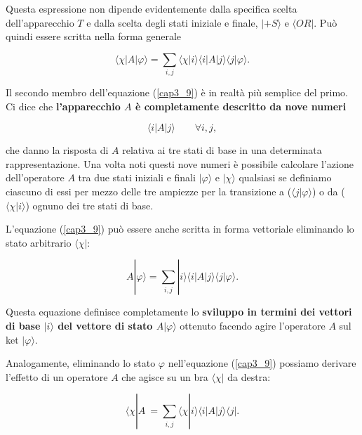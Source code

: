 Questa espressione non dipende evidentemente dalla specifica scelta dell'apparecchio $T$ e dalla scelta degli stati iniziale e finale, $| +S \rangle $ e $\langle OR |$. Può quindi essere scritta nella forma generale

\begin{equation}
\langle \chi | A | \varphi \rangle = \sum \limits_{i,j} \langle \chi | i \rangle \langle i | A | j \rangle \langle j | \varphi \rangle .
\label{cap3_9}
\end{equation}

Il secondo membro dell'equazione (\ref{cap3_9}) è in realtà più semplice del primo. Ci dice che \textbf{l'apparecchio $A$ è completamente descritto da nove numeri}

\begin{equation}
\langle i | A | j \rangle  \qquad \forall i,j ,
\end{equation}

che danno la risposta di $A$ relativa ai tre stati di base in una determinata rappresentazione. Una volta noti questi nove numeri è possibile calcolare l'azione dell'operatore $A$ tra due stati iniziali e finali $| \varphi \rangle $ e $| \chi \rangle$ qualsiasi se definiamo ciascuno di essi per mezzo delle tre ampiezze per la transizione a ($\langle j | \varphi \rangle $) o da ($\langle \chi | i \rangle$) ognuno dei tre stati di base.

L'equazione (\ref{cap3_9}) può essere anche scritta in forma vettoriale eliminando lo stato arbitrario $\langle \chi | $:

\begin{equation}
A| \varphi \rangle = \sum \limits_{i,j}  |i \rangle \langle i | A | j \rangle \langle j | \varphi \rangle .
\label{cap3_10}
\end{equation}

Questa equazione definisce completamente lo \textbf{sviluppo in termini dei vettori di base $ | i \rangle$ del vettore di stato $A | \varphi \rangle $} ottenuto facendo agire l'operatore $A$ sul ket $ | \varphi \rangle$.

Analogamente, eliminando lo stato $\varphi$ nell'equazione (\ref{cap3_9}) possiamo derivare l'effetto di un operatore $A$ che agisce su un bra $ \langle \chi |$ da destra:

\begin{equation}
\langle \chi | A\ = \sum \limits_{i,j} \langle \chi | i \rangle \langle i | A  | j \rangle \langle j | .
\label{cap3_11}
\end{equation}

